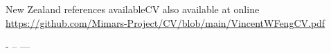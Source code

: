 

\begin{cventries}

  \cventry
    {}{New Zealand references available}{}{}{CV also available at online \url{https://github.com/Mimars-Project/CV/blob/main/VincentWFengCV.pdf}}

-
--
---

\end{cventries}

